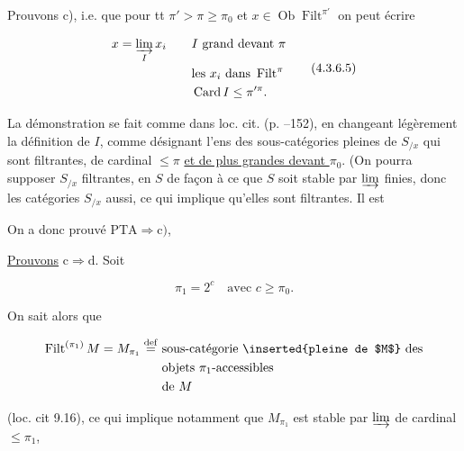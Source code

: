 

Prouvons c), i.e. que pour tt $\pi'>\pi\geq\pi_0$ et  $x\in\operatorname{Ob}\operatorname{Filt}^{\pi'}$ on peut écrire

\[
\begin{aligned}
x=\varinjlim_I x_i\qquad & I\ \text{grand devant }\pi\\
&\text{les }x_i\text{ dans }\operatorname{Filt}^{\pi}\\
&\operatorname{Card} I\leq\pi'^{\pi}.
\end{aligned}\tag*{(4.3.6.5)}
\]

La démonstration se fait comme dans  loc. cit. (p. --152), en changeant légèrement la définition de $I$, comme désignant l'ens des sous-catégories pleines  de $S_{/x}$ qui sont filtrantes, de cardinal $\leq\pi$ \uline{et de plus grandes devant $\pi_0$}. (On pourra supposer  $S_{/x}$ filtrantes, en   $S$ de façon à ce que $S$ soit stable  par  $\varinjlim$ finies, donc les catégories $S_{/x}$ aussi, ce qui implique qu'elles sont filtrantes. Il est


On a donc prouvé $\mathrm{PTA}\Longrightarrow\mathrm{c})$,

\uline{Prouvons} $\mathrm c\Longrightarrow\mathrm d$. Soit  

\[
\pi_1=2^c\quad\text{avec }c\geq\pi_0.
\]

On sait alors que

\[
\begin{aligned}
\operatorname{Filt}^{(\pi_1)}M=M_{\pi_1}\overset{\mathrm{def}}{=}\ &\text{sous-catégorie \inserted{pleine de $M$} des}\\
&\text{objets }\pi_1\text{-accessibles}\\
&\text{de }M
\end{aligned}
\]

(loc. cit 9.16), ce qui implique notamment que $M_{\pi_1}$ est stable par $\varinjlim$ de cardinal $\leq\pi_1$, 

